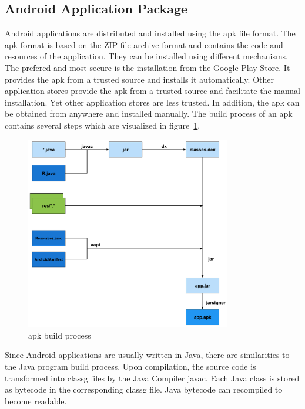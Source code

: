 \subsection{Android Application Package} \label{subsection:foundation-android-package}
Android applications are distributed and installed using the \gls{apk} file format.
The \gls{apk} format is based on the ZIP file archive format and contains the code and resources of the application.
They can be installed using different mechanisms.
The prefered and most secure is the installation from the Google Play Store.
It provides the \gls{apk} from a trusted source and installs it automatically.
Other application stores provide the \gls{apk} from a trusted source and facilitate the manual installation.
Yet other application stores are less trusted.
In addition, the \gls{apk} can be obtained from anywhere and installed manually.
The build process of an \gls{apk} contains several steps which are visualized in figure~\ref{fig:apk}.
\newline
\newline
\begin{figure}[h]
    \centering
    \includegraphics[width=0.8\textwidth]{data/apk.png}
    \caption{\gls{apk} build process \cite{andevconDalvikART}}
    \label{fig:apk}
\end{figure}
Since Android applications are usually written in Java, there are similarities to the Java program build process.
Upon compilation, the source code is transformed into \gls{classg} files by the Java Compiler javac.
Each Java class is stored as bytecode in the corresponding \gls{classg} file.
Java bytecode can recompiled to become readable.
